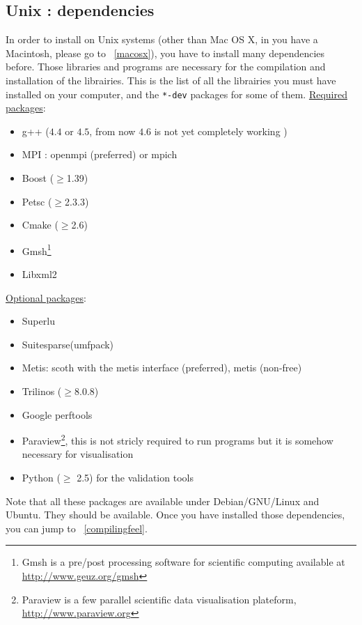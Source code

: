 \subsection{Unix : dependencies}
\label{sec:about-dependencies}

In order to install \feel on Unix systems (other than Mac OS X, in you have a Macintosh, please go to ~\ref{macosx}), you have to install many dependencies
before. Those libraries and programs are necessary for the
compilation and installation of the \feel librairies.
This is the list of all the librairies you must have installed on your
computer, and the \verb|*-dev| packages for some of them. 
\newline\newline
\underline{Required packages}:
\begin{itemize}
\item g++ ($4.4$ or $4.5$, from now $4.6$ is not yet	completely working  )
\item MPI : openmpi (preferred) or mpich
\item Boost ($\geq$1.39)
\item Petsc ($\geq$2.3.3)
\item Cmake ($\geq$2.6)
\item Gmsh\footnote{Gmsh is a pre/post processing software for scientific
computing available at \url{http://www.geuz.org/gmsh}}
\item Libxml2
\end{itemize}
\underline{Optional packages}:
\begin{itemize}
\item Superlu
\item Suitesparse(umfpack)
\item Metis: scoth with the metis interface (preferred), metis (non-free)
\item Trilinos ($\geq$8.0.8)
\item Google perftools
\item Paraview\footnote{Paraview is a few parallel scientific data
    visualisation plateform, \url{http://www.paraview.org}}, this is
  not stricly required to run \feel programs but it is somehow
  necessary for visualisation
\item Python ($\geq$ 2.5) for the validation tools
\end{itemize}
Note that all these packages are available under Debian/GNU/Linux and
Ubuntu. They should be available. Once you have installed those dependencies, you can jump to ~\ref{compilingfeel}.

